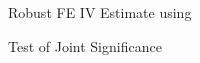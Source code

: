 Robust FE IV Estimate using 
\begin{stlog}\end{stlog}
Test of Joint Significance
\begin{stlog}\end{stlog}
